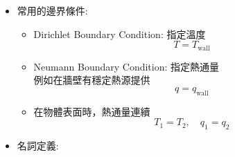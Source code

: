 \documentclass[../main.tex]{subfiles}
\begin{document}
\begin{itemize}
\begin{itemize}
\begin{itemize}
\begin{equation}
            \end{equation}
            \item 對固體或液體，$k$是常數，系統內流體沒有流動$\vec {\bm u}=0$，沒有熱源提供($\dot q=0$)
              \begin{equation}
                \rho C_p \frac{\partial T}{\partial t} = k\nabla^2 T
              \end{equation}
              此為傅立葉第二定律，及其滿足條件\\
              移項可得到:
              \begin{equation}
                \frac{\partial T}{\partial t} = \frac{k}{\rho C_p}\nabla^2 T
              \end{equation}
              P.S. 從此式也定義了熱擴散係數$\alpha = \frac{k}{\rho C_p}$
            \item 沒有流體流動，穩態:
              \begin{equation}
                \boxed{\nabla^2T + \frac{\dot q}{k} = 0}
              \end{equation}
              此為: Poisson Equation
            \item 沒有流體流動，穩態，沒有熱源提供($\dot q=0$):
              \begin{equation}
                \boxed{\nabla^2T = 0}
              \end{equation}
              此為: Laplace Equation
        \end{itemize}
    \end{itemize}
  \item 常用的邊界條件:
    \begin{itemize}
      \item Dirichlet Boundary Condition: 指定溫度
      \begin{equation}
        T = T_{\text{wall}}
      \end{equation}
      \item Neumann Boundary Condition: 指定熱通量\\
      例如在牆壁有穩定熱源提供
      \begin{equation}
        q = q_{\text{wall}}
      \end{equation}
      \item 在物體表面時，熱通量連續
      \begin{equation}
        T_1 = T_2, \quad q_1 = q_2
      \end{equation}
    \end{itemize}
  \item 名詞定義:

\end{itemize}
\end{document}

